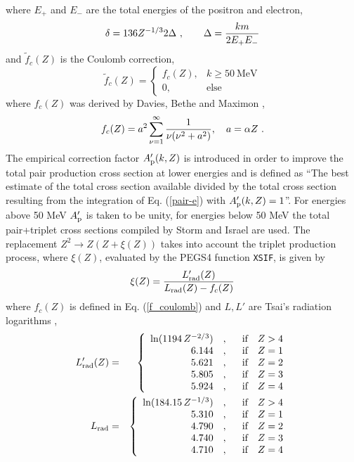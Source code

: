 where $E_+$ and $E_-$ are the total energies of the
positron and electron,
\begin{equation}
\delta = 136 Z^{-1/3} 2 \Delta~,\quad \quad \Delta = {k m \over 2 E_+ E_-}
\end{equation}
and $\tilde{f}_c(Z)$ is the Coulomb correction,
\begin{equation}
\label{f_coulomb}
\tilde{f}_c(Z) =
\begin{cases}
f_c(Z), & k \ge 50~\text{MeV} \\
0, & \text{else}
\end{cases}
\end{equation}
where $f_c(Z)$ was derived by
Davies, Bethe and Maximon \cite{Da54},
\begin{equation}
\label{f_coulomb1}
f_c(Z) = a^2 \sum_{\nu=1}^\infty {1 \over \nu (\nu^2 + a^2)}, \quad
a = \alpha Z~.
\end{equation}
The empirical correction factor $A_{\rm p}'(k,Z)$ is
introduced in order to improve the total pair production
cross section at lower energies and is defined
as ``The best estimate of the total cross section
available divided by the total cross section resulting
from the integration of Eq. (\ref{pair-e}) with
$A_{\rm p}'(k,Z)=1$''. For energies above
50 MeV $A_{\rm p}'$ is taken to be unity, for
energies below 50 MeV the total pair+triplet cross sections compiled
by Storm and Israel \cite{SI70} are used.
The replacement $Z^2 \to Z (Z + \xi(Z))$ takes
into account the triplet production process, where $\xi(Z)$,
evaluated by the PEGS4 function {\tt XSIF},  is given by
\begin{equation}
\xi(Z) = {L_{\rm rad}'(Z) \over L_{\rm rad}(Z) - f_c(Z)}
\end{equation}
where $f_c(Z)$ is defined in Eq. (\ref{f_coulomb}) and
$L,L'$ are Tsai's radiation logarithms \cite{Ts74},
\begin{eqnarray}
L_{\rm rad}'(Z) & = &
\left\{
\begin{array}{r@{\quad , \quad}l}
\ln(1194\,Z^{-2/3}) &~~\mbox{if}~~~Z > 4 \\
6.144 & ~~\mbox{if}~~~Z = 1 \\
5.621 & ~~\mbox{if}~~~Z = 2 \\
5.805 & ~~\mbox{if}~~~Z = 3 \\
5.924 & ~~\mbox{if}~~~Z = 4
\end{array} \right. \nonumber \\
L_{\rm rad} & = &
\left\{
\begin{array}{r@{\quad , \quad}l}
\ln(184.15\,Z^{-1/3}) &~~\mbox{if}~~~Z > 4 \\
5.310 & ~~\mbox{if}~~~Z = 1 \\
4.790 & ~~\mbox{if}~~~Z = 2 \\
4.740 & ~~\mbox{if}~~~Z = 3 \\
4.710 & ~~\mbox{if}~~~Z = 4
\end{array} \right.
\end{eqnarray}
